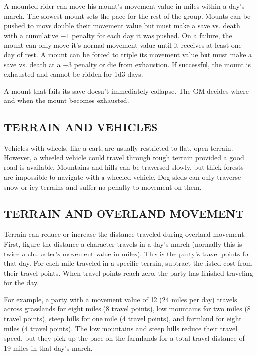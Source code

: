 \begin{multicols}{2}
A mounted rider can move his mount's movement value in miles within a day's march.  The slowest mount sets the pace for the rest of the group.  Mounts can be pushed to move double their movement value but must make a save vs. death with a cumulative $-1$ penalty for each day it was pushed.  On a failure, the mount can only move it's normal movement value until it receives at least one day of rest.  A mount can be forced to triple its movement value but must make a save vs. death at a $-3$ penalty or die from exhaustion.  If successful, the mount is exhausted and cannot be ridden for 1d3 days.

A mount that fails its save doesn't immediately collapse.  The GM decides where and when the mount becomes exhausted.

\subsection{TERRAIN AND VEHICLES}

Vehicles with wheels, like a cart, are usually restricted to flat, open terrain. However, a wheeled vehicle could travel through rough terrain provided a good road is available.  Mountains and hills can be traversed slowly, but thick forests are impossible to navigate with a wheeled vehicle.  Dog sleds can only traverse snow or icy terrains and suffer no penalty to movement on them.  

\subsection{TERRAIN AND OVERLAND MOVEMENT}

Terrain can reduce or increase the distance traveled during overland movement.  First, figure the distance a character travels in a day's march (normally this is twice a character's movement value in miles).  This is the party's travel points for that day.  For each mile traveled in a specific terrain, subtract the listed cost from their travel points.  When travel points reach zero, the party has finished traveling for the day.

For example, a party with a movement value of 12 (24 miles per day) travels across grasslands for eight miles (8 travel points), low mountains for two miles (8 travel points), steep hills for one mile (4 travel points), and farmland for eight miles (4 travel points).  The low mountains and steep hills reduce their travel speed, but they pick up the pace on the farmlands for a total travel distance of 19 miles in that day's march.


\end{multicols}
